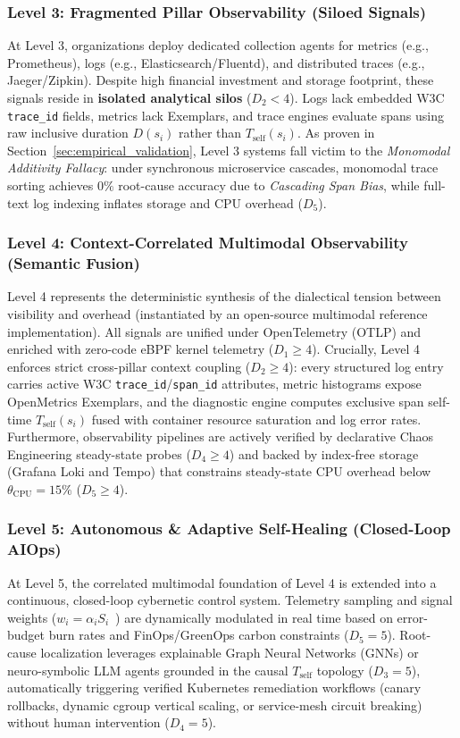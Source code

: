 \subsubsection{Level 3: Fragmented Pillar Observability (Siloed Signals)}
At Level 3, organizations deploy dedicated collection agents for metrics (e.g., Prometheus), logs (e.g., Elasticsearch/Fluentd), and distributed traces (e.g., Jaeger/Zipkin). Despite high financial investment and storage footprint, these signals reside in \textbf{isolated analytical silos} ($D_2 < 4$). Logs lack embedded W3C \texttt{trace\_id} fields, metrics lack Exemplars, and trace engines evaluate spans using raw inclusive duration $D(s_i)$ rather than $T_{\text{self}}(s_i)$. As proven in Section~\ref{sec:empirical_validation}, Level 3 systems fall victim to the \textit{Monomodal Additivity Fallacy}: under synchronous microservice cascades, monomodal trace sorting achieves $0\%$ root-cause accuracy due to \textit{Cascading Span Bias}, while full-text log indexing inflates storage and CPU overhead ($D_5$).

\subsubsection{Level 4: Context-Correlated Multimodal Observability (Semantic Fusion)}
Level 4 represents the deterministic synthesis of the dialectical tension between visibility and overhead (instantiated by an open-source multimodal reference implementation). All signals are unified under OpenTelemetry (OTLP) and enriched with zero-code eBPF kernel telemetry ($D_1 \ge 4$). Crucially, Level 4 enforces strict cross-pillar context coupling ($D_2 \ge 4$): every structured log entry carries active W3C \texttt{trace\_id}/\texttt{span\_id} attributes, metric histograms expose OpenMetrics Exemplars, and the diagnostic engine computes exclusive span self-time $T_{\text{self}}(s_i)$ fused with container resource saturation and log error rates. Furthermore, observability pipelines are actively verified by declarative Chaos Engineering steady-state probes ($D_4 \ge 4$) and backed by index-free storage (Grafana Loki and Tempo) that constrains steady-state CPU overhead below $\theta_{\text{CPU}} = 15\%$ ($D_5 \ge 4$).

\subsubsection{Level 5: Autonomous \& Adaptive Self-Healing (Closed-Loop AIOps)}
At Level 5, the correlated multimodal foundation of Level 4 is extended into a continuous, closed-loop cybernetic control system. Telemetry sampling and signal weights ($w_i = \alpha_i S_i$~\cite{amgothu_2025}) are dynamically modulated in real time based on error-budget burn rates and FinOps/GreenOps carbon constraints ($D_5 = 5$). Root-cause localization leverages explainable Graph Neural Networks (GNNs) or neuro-symbolic LLM agents grounded in the causal $T_{\text{self}}$ topology ($D_3 = 5$), automatically triggering verified Kubernetes remediation workflows (canary rollbacks, dynamic cgroup vertical scaling, or service-mesh circuit breaking) without human intervention ($D_4 = 5$).

